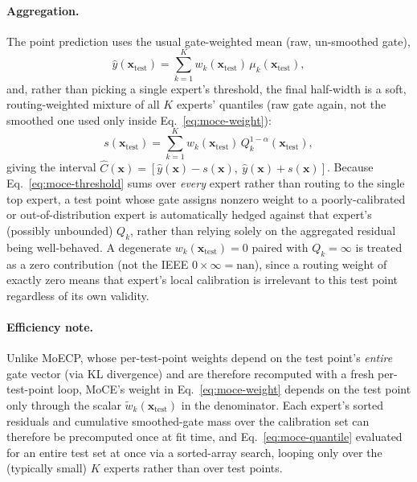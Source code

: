 \documentclass[11pt]{article}
\begin{document}
\paragraph{Aggregation.} The point prediction uses the usual gate-weighted mean (raw, un-smoothed
gate),
\begin{equation}
\hat{y}(\bm{x}_{\mathrm{test}}) = \sum_{k=1}^{K} w_k(\bm{x}_{\mathrm{test}})\,
\mu_k(\bm{x}_{\mathrm{test}}),
\end{equation}
and, rather than picking a single expert's threshold, the final half-width is a soft,
routing-weighted mixture of all $K$ experts' quantiles (raw gate again, not the smoothed one used
only inside Eq.~\eqref{eq:moce-weight}):
\begin{equation}
s(\bm{x}_{\mathrm{test}}) = \sum_{k=1}^{K} w_k(\bm{x}_{\mathrm{test}}) \,
Q_k^{1-\alpha}(\bm{x}_{\mathrm{test}}),
\label{eq:moce-threshold}
\end{equation}
giving the interval $\hat{C}(\bm{x}) = [\hat{y}(\bm{x}) - s(\bm{x}),\ \hat{y}(\bm{x}) +
s(\bm{x})]$. Because
Eq.~\eqref{eq:moce-threshold} sums over \emph{every} expert rather than routing to the single
top expert, a test point whose gate assigns nonzero weight to a poorly-calibrated or
out-of-distribution expert is automatically hedged against that expert's (possibly unbounded)
$Q_k$, rather than relying solely on the aggregated residual being well-behaved. A degenerate
$w_k(\bm{x}_{\mathrm{test}})=0$ paired with $Q_k=\infty$ is treated as a zero contribution (not
the IEEE $0\times\infty=\mathrm{nan}$), since a routing weight of exactly zero means that expert's
local calibration is irrelevant to this test point regardless of its own validity.

\paragraph{Efficiency note.} Unlike MoECP, whose per-test-point weights depend on the test point's
\emph{entire} gate vector (via KL divergence) and are therefore recomputed with a fresh
per-test-point loop, MoCE's weight in Eq.~\eqref{eq:moce-weight} depends on the test point only
through the scalar $\tilde{w}_k(\bm{x}_{\mathrm{test}})$ in the denominator. Each expert's sorted
residuals and cumulative smoothed-gate mass over the calibration set can therefore be precomputed
once at fit time, and Eq.~\eqref{eq:moce-quantile} evaluated for an entire test set at once via a
sorted-array search, looping only over the (typically small) $K$ experts rather than over test
points.
\end{document}
